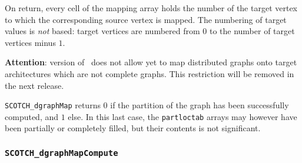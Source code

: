\begin{itemize}
On return, every cell of the mapping array holds the number of the
target vertex to which the corresponding source vertex is mapped.
The numbering of target values is {\em not\/} based: target vertices
are numbered from $0$ to the number of target vertices minus $1$.

{\bf Attention}: version {} of \scotch\ does not allow yet to
map distributed graphs onto target architectures which are not
complete graphs. This restriction will be removed in the next release.

\progret

{\tt SCOTCH\_dgraphMap} returns $0$ if the partition of the graph has
been successfully computed, and $1$ else. In this last case, the
{\tt partloctab} arrays may however have been partially or completely
filled, but their contents is not significant.
\end{itemize}

\subsubsection{{\tt SCOTCH\_dgraphMapCompute}}

